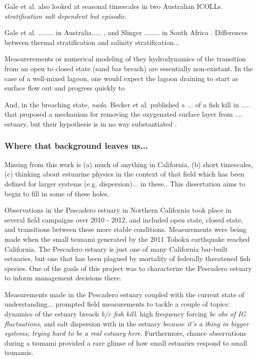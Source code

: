 Gale et al. \parencite*{gale_vertical_2006} also looked at seasonal timescales in two Australian ICOLLs. \emph{stratification salt dependent but episodic}. 




 Gale et al. ........ in Australia..... \parencite*{gale_vertical_2006}, and Slinger ........ in South Africa \parencite*{slinger_evolution_1990}. Differences between thermal stratification and salinity stratification... 

Measurerements or numerical modeling of they hydrodynamics of the transition from an open to closed state (sand bar breach) are essentially non-existant. In the case of a well-mixed lagoon, one would expect the lagoon draining to start as surface flow out and progress quickly to 

And, in the breaching state, \emph{nada}. Becker et al. published a ... of a fish kill in .... that proposed a mechanism for removing the oxygenated surface layer from .... estuary, but their hypothesis is in no way substantiated \parencite*{becker_artificial_2009}.





\subsubsection{Where that background leaves us...}

Missing from this work is (a) much of anything in California, (b) short timescales, (c) thinking about estuarine physics in the context of that field which has been defined for larger systems (e.g. dispersion)... in these.. This dissertation aims to begin to fill in some of these holes. 

Observations in the Pescadero estuary in Northern California took place in several field campaigns over 2010 - 2012, and included open state, closed state, and transitions between these more stable conditions. Measurements were being made when the small tsunami generated by the 2011 Tohok$\overline{\mathrm{u}}$ earthquake reached California. The Pescadero estuary is just one of many California bar-built estuaries, but one that has been plagued by mortality of federally threatened fish species. One of the goals of this project was to characterize the Pescadero estuary to inform management decisions there. 

Measurements made in the Pescadero estuary coupled with the current state of understanding... prompted field measurements to tackle a couple of topics: dynamics of the estuary breach \emph{b/c fish kill}. high frequency forcing \emph{bc obs of IG fluctuations}, and salt dispersion with in the estuary \emph{because it's a thing in bigger systems, trying hard to be a real estuary here}. Furthermore, chance observations during a tsunami provided a rare glimse of how small estuaries respond to small tsunamis. 

